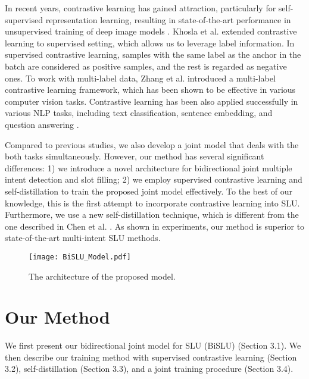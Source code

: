 \documentclass{ecai}
\begin{document}
In recent years, contrastive learning has gained attraction, particularly for self-supervised representation learning, resulting in state-of-the-art performance in unsupervised training of deep image models \cite{chen:2020}. Khosla et al. \cite{khosla:2020} extended contrastive learning to supervised setting, which allows us to leverage label information. In supervised contrastive learning, samples with the same label as the anchor in the batch are considered as positive samples, and the rest is regarded as negative ones. To work with multi-label data, Zhang et al. \cite{zhang:2022} introduced a multi-label contrastive learning framework, which has been shown to be effective in various computer vision tasks. Contrastive learning has been also applied successfully in various NLP tasks, including text classification, sentence embedding, and question answering \cite{karpukhin:2020,kim:2021,suresh:2021,you:2021,zhang:2021}. 

Compared to previous studies, we also develop a joint model that deals with the both tasks simultaneously. However, our method has several significant differences: 1) we introduce a novel architecture for bidirectional joint multiple intent detection and slot filling; 2) we employ supervised contrastive learning and self-distillation to train the proposed joint model effectively. To the best of our knowledge, this is the first attempt to incorporate contrastive learning into SLU. Furthermore, we use a new self-distillation technique, which is different from the one described in Chen et al. \cite{chen:2022}. As shown in experiments, our method is superior to state-of-the-art multi-intent SLU methods.    
\begin{figure}[t]
       \vspace{-10pt}
	\begin{center}
		\texttt{[image: BiSLU\_Model.pdf]}
	\end{center}
	\vspace{-5pt}
		\caption{The architecture of the proposed model.}
	\label{fig:model}
\end{figure}
\section{Our Method}
We first present our bidirectional joint model for SLU (BiSLU) (Section 3.1). We then describe our training method with supervised contrastive learning (Section 3.2), self-distillation (Section 3.3), and a joint training procedure (Section 3.4). 
\end{document}
